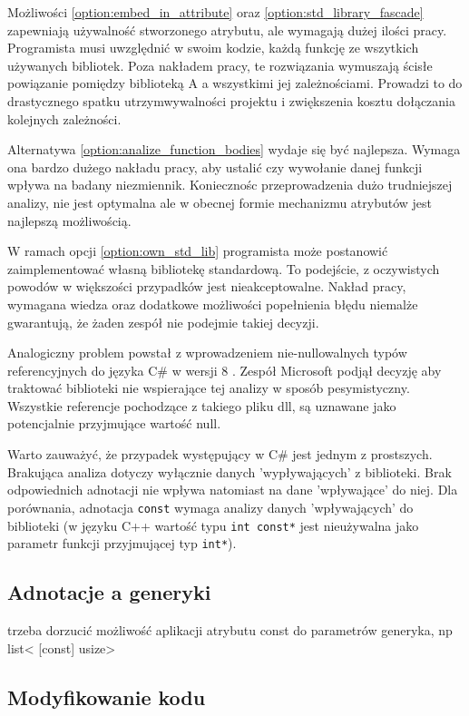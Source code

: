 Możliwości \ref{option:embed_in_attribute} oraz \ref{option:std_library_fascade} zapewniają używalność stworzonego atrybutu, ale wymagają dużej ilości pracy.
Programista musi uwzględnić w swoim kodzie, każdą funkcję ze wszytkich używanych bibliotek.
Poza nakładem pracy, te rozwiązania wymuszają ścisłe powiązanie pomiędzy biblioteką A a wszystkimi jej zależnościami.
Prowadzi to do drastycznego spatku utrzymwywalności projektu i zwiększenia kosztu dołączania kolejnych zależności.

Alternatywa \ref{option:analize_function_bodies} wydaje się być najlepsza. 
Wymaga ona bardzo dużego nakładu pracy, aby ustalić czy wywołanie danej funkcji wpływa na badany niezmiennik.
Koniecznośc przeprowadzenia dużo trudniejszej analizy, nie jest optymalna ale w obecnej formie mechanizmu atrybutów jest najlepszą możliwością.

W ramach opcji \ref{option:own_std_lib} programista może postanowić zaimplementować własną bibliotekę standardową.
To podejście, z oczywistych powodów w większości przypadków jest nieakceptowalne.
Nakład pracy, wymagana wiedza oraz dodatkowe możliwości popełnienia błędu niemalże gwarantują, że żaden zespół nie podejmie takiej decyzji.

Analogiczny problem powstał z wprowadzeniem nie-nullowalnych typów referencyjnych do języka C\# w wersji 8 \cite{wagner_2021}.
Zespół Microsoft podjął decyzję aby traktować biblioteki nie wspierające tej analizy w sposób pesymistyczny.
Wszystkie referencje pochodzące z takiego pliku dll, są uznawane jako potencjalnie przyjmujące wartość null.

Warto zauważyć, że przypadek występujący w C\# jest jednym z prostszych.
Brakująca analiza dotyczy wyłącznie danych 'wypływających' z biblioteki.
Brak odpowiednich adnotacji nie wpływa natomiast na dane 'wpływające' do niej.
Dla porównania, adnotacja \lstinline{const} wymaga analizy danych 'wpływających' do biblioteki (w języku C++ wartość typu \lstinline{int const*} jest nieużywalna jako parametr funkcji przyjmującej typ \lstinline{int*}).

\subsection{Adnotacje a generyki}

trzeba dorzucić możliwość aplikacji atrybutu const do parametrów generyka, np list< [const] usize>

\subsection{Modyfikowanie kodu}


